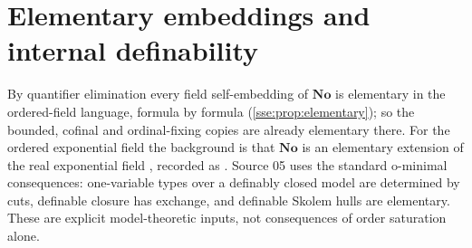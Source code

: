 \documentclass[11pt,a4paper]{article}
\numberwithin{equation}{section}
\theoremstyle{plain}
\theoremstyle{definition}
\theoremstyle{remark}
\newcommand{\No}{\mathbf{No}}
\begin{document}
\section{Elementary embeddings and internal definability}\label{sse:co:sec:model}

By quantifier elimination every field self-embedding of $\No$ is elementary
in the ordered-field language, formula by formula (\cref{sse:prop:elementary});
so the bounded, cofinal and ordinal-fixing copies are already elementary
there. For the ordered exponential field the background is that $\No$ is an
elementary extension of the real exponential field \cite{vdDE}, recorded as
\cite[Proposition~1.5]{EhrlichKaplan}. Source 05 uses the standard o-minimal
consequences: one-variable types over a definably closed model are determined
by cuts, definable closure has exchange, and definable Skolem hulls are
elementary. These are explicit model-theoretic inputs, not consequences of
order saturation alone.
\end{document}
